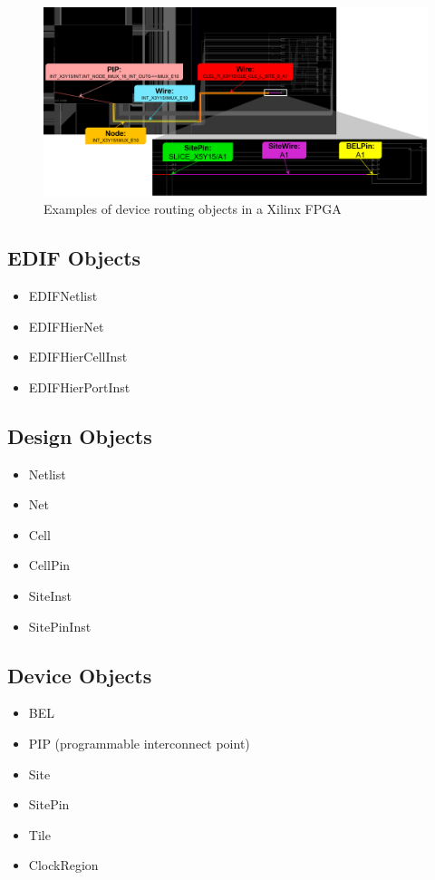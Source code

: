 \documentclass[twocolumn]{article}
\begin{document}
    \begin{figure}
        \centering
        \includegraphics[width=\textwidth]{figures/routing_objects.png}
        \caption{Examples of device routing objects in a Xilinx FPGA}
        \label{fig:routing_objects}
    \end{figure}


    \subsection{EDIF Objects}
        \begin{itemize}
            \item EDIFNetlist
            \item EDIFHierNet
            \item EDIFHierCellInst
            \item EDIFHierPortInst
        \end{itemize}
    \subsection{Design Objects}
        \begin{itemize}
            \item Netlist
            \item Net
            \item Cell
            \item CellPin
            \item SiteInst
            \item SitePinInst
        \end{itemize}
    \subsection{Device Objects}
        \begin{itemize}
            \item BEL
            \item PIP (programmable interconnect point)
            \item Site
            \item SitePin
            \item Tile
            \item ClockRegion
        \end{itemize}
\end{document}
